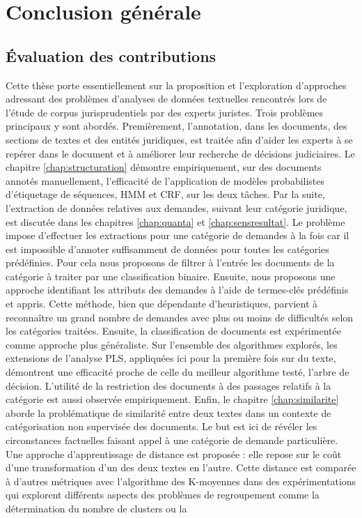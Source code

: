 \chapter*{Conclusion générale}
\label{chap:conclusion}


\section{Évaluation des contributions}
\label{sec:conclusion:contributions}
Cette thèse  porte essentiellement sur la proposition et l'exploration d'approches adressant des problèmes d'analyses de données textuelles rencontrés lors de l'étude de corpus jurisprudentiels par des experts juristes. Trois problèmes principaux y sont abordés. Premièrement, l'annotation, dans les documents, des sections de textes et des entités juridiques, est traitée afin d'aider les experts à se repérer dans le document et à améliorer leur recherche de décisions judiciaires. Le chapitre \ref{chap:structuration}  démontre empiriquement, sur des documents annotés manuellement, l'efficacité de l'application de modèles probabilistes d'étiquetage de séquences, HMM et CRF, sur les deux tâches. Par la suite, l'extraction de données relatives aux demandes, suivant leur catégorie juridique, est discutée dans les chapitres \ref{chap:quanta} et \ref{chap:sensresultat}. Le problème impose d'effectuer les extractions pour une catégorie de demandes à la fois car il est impossible d'annoter suffisamment de données pour toutes les catégories prédéfinies. Pour cela nous proposons de filtrer à l'entrée les documents de la catégorie à traiter par une classification binaire. Ensuite, nous proposons une approche  identifiant les attributs des demandes à l'aide de termes-clés prédéfinis et appris. Cette méthode, bien que dépendante d'heuristiques, parvient à reconnaître un grand nombre de demandes avec plus ou moins de difficultés selon les catégories traitées. Ensuite, la classification de documents est expérimentée comme approche plus généraliste. Sur l'ensemble des algorithmes explorés, les extensions de l'analyse PLS, appliquées ici pour la première fois sur du texte, démontrent une efficacité proche de celle du meilleur algorithme testé, l'arbre de décision. L'utilité de la restriction des documents à des passages relatifs à la catégorie est aussi observée empiriquement. Enfin, le chapitre \ref{chap:similarite} aborde la problématique de similarité entre deux textes dans un contexte de catégorisation non supervisée des documents. Le but est ici de révéler les circonstances factuelles faisant appel à une catégorie de demande particulière. Une approche d'apprentissage de distance est proposée : elle repose sur le coût d'une transformation d'un des deux textes en l'autre. Cette distance est comparée à d'autres métriques avec l'algorithme des K-moyennes dans des expérimentations qui explorent différents aspects des problèmes de regroupement comme la détermination du nombre de clusters ou la 